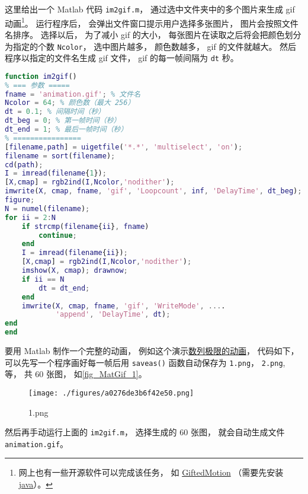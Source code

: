 

这里给出一个 Matlab 代码 \verb|im2gif.m|， 通过选中文件夹中的多个图片来生成 gif 动画\footnote{网上也有一些开源软件可以完成该任务， 如 \href{http://www.onyxbits.de/giftedmotion}{GiftedMotion} （需要先安装 \href{https://www.java.com/download/ie_manual.jsp}{java}）。}。 运行程序后， 会弹出文件窗口提示用户选择多张图片， 图片会按照文件名排序。 选择以后， 为了减小 gif 的大小， 每张图片在读取之后将会把颜色划分为指定的个数 \verb|Ncolor|， 选中图片越多， 颜色数越多， gif 的文件就越大。 然后程序以指定的文件名生成 gif 文件， gif 的每一帧间隔为 \verb|dt| 秒。

\begin{lstlisting}[language=matlab, caption=im2gif.m]
function im2gif()
% === 参数 =====
fname = 'animation.gif'; % 文件名
Ncolor = 64; % 颜色数（最大 256）
dt = 0.1; % 间隔时间（秒）
dt_beg = 0; % 第一帧时间（秒）
dt_end = 1; % 最后一帧时间（秒）
% ================
[filename,path] = uigetfile('*.*', 'multiselect', 'on');
filename = sort(filename);
cd(path);
I = imread(filename{1});
[X,cmap] = rgb2ind(I,Ncolor,'nodither');
imwrite(X, cmap, fname, 'gif', 'Loopcount', inf, 'DelayTime', dt_beg);
figure;
N = numel(filename);
for ii = 2:N
    if strcmp(filename{ii}, fname)
        continue;
    end
    I = imread(filename{ii});
    [X,cmap] = rgb2ind(I,Ncolor,'nodither');
    imshow(X, cmap); drawnow;
    if ii == N
        dt = dt_end;
    end
    imwrite(X, cmap, fname, 'gif', 'WriteMode', ....
            'append', 'DelayTime', dt);
end
end
\end{lstlisting}

要用 Matlab 制作一个完整的动画， 例如这个演示\href{https://wuli.wiki/apps/Lim0.html}{数列极限的动画}， 代码如下， 可以先写一个程序画好每一帧后用 \verb|saveas()| 函数自动保存为 \verb|1.png|， \verb|2.png|, 等， 共 60 张图， 如\autoref{fig_MatGif_1}。
\begin{figure}[ht]
\centering
\texttt{[image: ./figures/a0276de3b6f42e50.png]}
\caption{1.png} \label{fig_MatGif_1}
\end{figure}
然后再手动运行上面的 \verb|im2gif.m|， 选择生成的 60 张图， 就会自动生成文件 \verb|animation.gif|。

